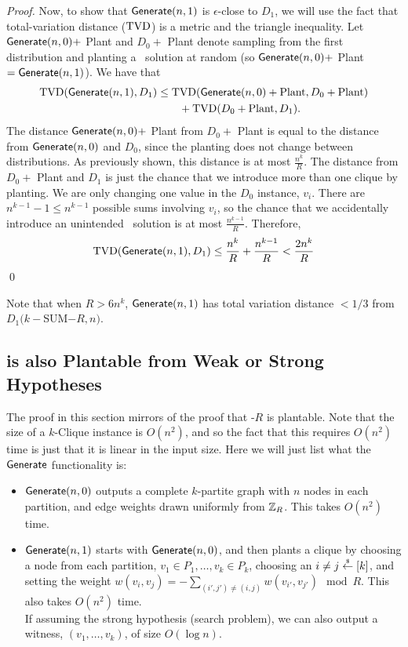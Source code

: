 \begin{proof}
	Now, to show that $\mathsf{Generate}(n,1)$ is $\epsilon$-close to $D_1$, we will use the fact that total-variation distance ($\mathrm{TVD}$) is a metric and the triangle inequality. Let $\mathsf{Generate}(n,0) +$ Plant and $D_0 + $ Plant denote sampling from the first distribution and planting a \kSum~solution at random (so $\mathsf{Generate}(n,0) +$ Plant $= \mathsf{Generate}(n,1)$). We have that
	\begin{align*}
	\mathrm{TVD}(\mathsf{Generate}(n,1), D_1) &\le \mathrm{TVD}(\mathsf{Generate}(n,0) + \mbox{Plant}, D_0 + \mbox{Plant})\\
	&\qquad + \mathrm{TVD}(D_0 + \mbox{Plant}, D_1).
	\end{align*}
	The distance $\mathsf{Generate}(n,0) +$ Plant from $D_0 + $ Plant is equal to the distance from $\mathsf{Generate}(n,0)$ and $D_0$, since the planting does not change between distributions. As previously shown, this distance is at most $\frac{n^k}{R}$. The distance from $D_0 +$ Plant and $D_1$ is just the chance that we introduce more than one clique by planting. We are only changing one value in the $D_0$ instance, $v_i$. There are $n^{k-1} - 1 \le n^{k-1}$ possible sums involving $v_i$, so the chance that we accidentally introduce an unintended \kSum~solution is at most $\frac{n^{k-1}}{R}$. Therefore,
	\[\mathrm{TVD}(\mathsf{Generate}(n,1), D_1) \le \frac{n^k}{R} + \frac{n^{k-1}}{R} < \frac{2n^k}{R}\] \qed
\end{proof}

Note that when $R > 6n^k$, $\mathsf{Generate}(n,1)$ has total variation distance $< 1/3$ from $D_1(k-$SUM$-R,n)$.

\subsection{\texorpdfstring{\zkclique}{} is also Plantable from Weak or Strong Hypotheses}
The proof in this section mirrors of the proof that \kSum-$R$ is plantable. Note that the size of a $k$-Clique instance is $O(n^2)$, and so the fact that this requires $O(n^2)$ time is just that it is linear in the input size. Here we will just list what the $\mathsf{Generate}$ functionality is:
\begin{itemize}
	\item $\mathsf{Generate}(n,0)$ outputs a complete $k$-partite graph with $n$ nodes in each partition, and edge weights drawn uniformly from $\mathbb{Z}_R$. This takes $O(n^2)$ time.
	\item $\mathsf{Generate}(n,1)$ starts with $\mathsf{Generate}(n,0)$, and then plants a clique by choosing a node from each partition, $v_1 \in P_1, \dots, v_k \in P_k$, choosing an $i \neq j \stackrel{\scriptscriptstyle{\$}}{\gets} [k]$, and setting the weight $w(v_i, v_j) = -\sum_{(i', j') \neq (i,j)} w(v_{i'}, v_{j'}) \mod R$. This also takes $O(n^2)$ time.\\
	If assuming the strong hypothesis (search problem), we can also output a witness, $(v_1,\ldots, v_k)$, of size $O(\log n)$.
\end{itemize}

